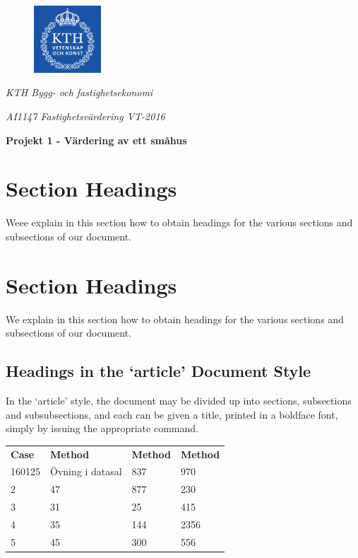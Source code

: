 \documentclass[12pt, a4paper]{article}
\begin{document}
\begin{figure}[t]
  \includegraphics[width=2.51cm]{KTH_Logotyp_RGB_2013}
  \centering
\end{figure}

\centerline{\textit{KTH Bygg- och fastighetsekonomi}}
\centerline{\textit{AI1147 Fastighetsvärdering VT-2016}}



\vspace{1cm}
\centerline{\bfseries\large{Projekt 1 - Värdering av ett småhus}}
\vspace{1cm}


\section*{Section Headings}
Weee explain in this section how to obtain headings
for the various sections and subsections of our
document.

\lipsum[1-8]

\section*{Section Headings}

We explain in this section how to obtain headings
for the various sections and subsections of our
document.

\subsection*{Headings in the `article' Document Style}

In the `article' style, the document may be divided up
into sections, subsections and subsubsections, and each
can be given a title, printed in a boldface font,
simply by issuing the appropriate command.

\begin{table}[ht]
\begin{tabular}{l l l l}
\bfseries Case & \bfseries Method & \bfseries Method & \bfseries Method \\ 
160125	& Övning i datasal	&	837	& 970 \\
2 & 47 & 877 & 230 \\
3 & 31 & 25  & 415 \\
4 & 35 & 144 & 2356 \\
5 & 45 & 300 & 556 \\ [1ex]
\end{tabular}
\label{table:nonlin}
\end{table}
\end{document}

